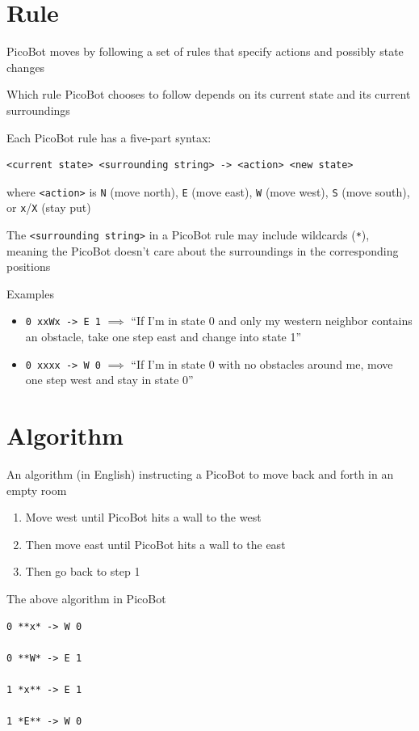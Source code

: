 \documentclass[8pt,a4paper,compress]{beamer}
\begin{document}
\section{Rule}
\begin{frame}[fragile]

PicoBot moves by following a set of rules that specify actions and possibly state changes

\bigskip

Which rule PicoBot chooses to follow depends on its current state and its current surroundings

\bigskip
Each PicoBot rule has a five-part syntax:
\begin{lstlisting}[language={}]
<current state> <surrounding string> -> <action> <new state>
\end{lstlisting}
where \lstinline{<action>} is \lstinline{N} (move north), \lstinline{E} (move east), \lstinline{W} (move west), \lstinline{S} (move south), or \lstinline{x}/\lstinline{X} (stay put)

\bigskip

The \lstinline{<surrounding string>} in a PicoBot rule may include wildcards (\lstinline{*}), meaning the PicoBot doesn't care about the surroundings in the corresponding positions

\bigskip

Examples
\begin{itemize}
\item \lstinline{0 xxWx -> E 1} $\implies$ ``If I'm in state 0 and only my western neighbor contains an obstacle, take one step east and change into state 1''

\item \lstinline{0 xxxx -> W 0} $\implies$ ``If I'm in state 0 with no obstacles around me, move one step west and stay in state 0''
\end{itemize}
\end{frame}

\section{Algorithm}
\begin{frame}[fragile]

An algorithm (in English) instructing a PicoBot to move back and forth in an empty room
\begin{enumerate}
\item Move west until PicoBot hits a wall to the west

\item Then move east until PicoBot hits a wall to the east

\item Then go back to step 1
\end{enumerate}


\bigskip

The above algorithm in PicoBot
\begin{lstlisting}[language={}]
0 **x* -> W 0

0 **W* -> E 1

1 *x** -> E 1

1 *E** -> W 0
\end{lstlisting}
\end{frame}
\end{document}
